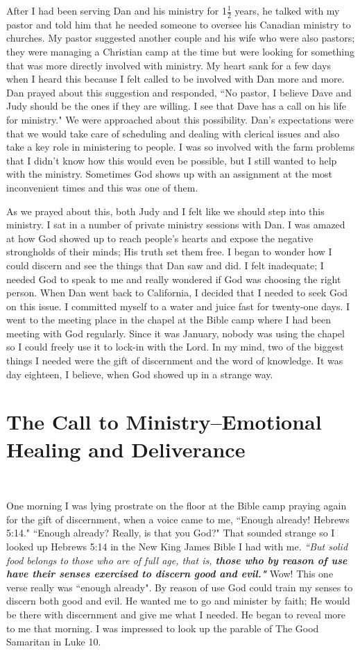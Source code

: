 \documentclass[oneside]{book}
\begin{document}
After I had been serving Dan and his ministry for 1$\frac{1}{2}$ years, he talked with my pastor and told him that he needed someone to oversee his Canadian ministry to churches. My pastor suggested another couple and his wife who were also pastors; they were managing a Christian camp at the time but were looking for something that was more directly involved with ministry. My heart sank for a few days when I heard this because I felt called to be involved with Dan more and more. Dan prayed about this suggestion and responded, ``No pastor, I believe Dave and Judy should be the ones if they are willing. I see that Dave has a call on his life for ministry." We were approached about this possibility. Dan's expectations were that we would take care of scheduling and dealing with clerical issues and also take a key role in ministering to people. I was so involved with the farm problems that I didn't know how this would even be possible, but I still wanted to help with the ministry. Sometimes God shows up with an assignment at the most inconvenient times and this was one of them.


As we prayed about this, both Judy and I felt like we should step into this ministry. I sat in a number of private ministry sessions with Dan. I was amazed at how God showed up to reach people's hearts and expose the negative strongholds of their minds; His truth set them free. I began to wonder how I could discern and see the things that Dan saw and did. I felt inadequate; I needed God to speak to me and really wondered if God was choosing the right person. When Dan went back to California, I decided that I needed to seek God on this issue. I committed myself to a water and juice fast for twenty-one days. I went to the meeting place in the chapel at the Bible camp where I had been meeting with God regularly. Since it was January, nobody was using the chapel so I could freely use it to lock-in with the Lord. In my mind, two of the biggest things I needed were the gift of discernment and the word of knowledge. It was day eighteen, I believe, when God showed up in a strange way.


\section{The Call to Ministry--Emotional Healing and Deliverance}
\

One morning I was lying prostrate on the floor at the Bible camp praying again for the gift of discernment, when a voice came to me, ``Enough already! Hebrews 5:14." ``Enough already? Really, is that you God?" That sounded strange so I looked up Hebrews 5:14 in the New King James Bible I had with me. \textit{``But solid food belongs to those who are of full age, that is, \textbf{those who by reason of use have their senses exercised to discern good and evil."}} Wow! This one verse really was ``enough already". By reason of use God could train my senses to discern both good and evil. He wanted me to go and minister by faith; He would be there with discernment and give me what I needed. He began to reveal more to me that morning. I was impressed to look up the parable of The Good Samaritan in Luke 10.
\end{document}
